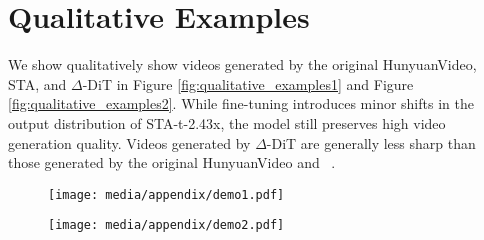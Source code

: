 \newpage


\newpage
\section{Qualitative Examples}
\label{sec:qualitative_example}
We show qualitatively show videos generated by the original HunyuanVideo, STA, and $\Delta$-DiT in Figure \ref{fig:qualitative_examples1} and Figure \ref{fig:qualitative_examples2}.  While fine-tuning introduces minor shifts in the output distribution of STA-t-2.43x, the model still preserves high video generation quality. Videos generated by $\Delta$-DiT are generally less sharp than those generated by the original HunyuanVideo and ~\methodnameshort.

\begin{figure*}[h]
    \centering
    \begin{subfigure}
        \centering
        \texttt{[image: media/appendix/demo1.pdf]}
    \end{subfigure}
    \begin{subfigure}
        \centering
        \texttt{[image: media/appendix/demo2.pdf]}
    \end{subfigure}
    \caption{Qualitative comparisons. While fine-tuning introduces minor shifts in the output distribution of STA-t-2.43x, the model still preserves high video generation quality. Videos generated by $\Delta$-DiT are generally less sharp than those generated by the original HunyuanVideo and ~\methodnameshort.}
    \label{fig:qualitative_examples1}
\end{figure*}

